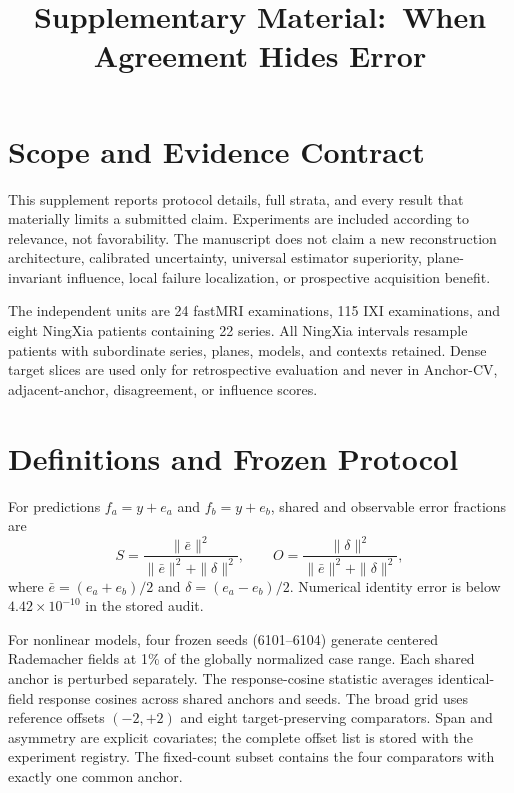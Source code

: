 \documentclass[10pt,twocolumn,letterpaper]{article}
\title{Supplementary Material:\
When Agreement Hides Error}
\begin{document}
\maketitle

\section{Scope and Evidence Contract}
This supplement reports protocol details, full strata, and every result that materially limits a submitted claim. Experiments are included according to relevance, not favorability. The manuscript does not claim a new reconstruction architecture, calibrated uncertainty, universal estimator superiority, plane-invariant influence, local failure localization, or prospective acquisition benefit.

The independent units are 24 fastMRI examinations, 115 IXI examinations, and eight NingXia patients containing 22 series. All NingXia intervals resample patients with subordinate series, planes, models, and contexts retained. Dense target slices are used only for retrospective evaluation and never in Anchor-CV, adjacent-anchor, disagreement, or influence scores.

\section{Definitions and Frozen Protocol}
For predictions $f_a=y+e_a$ and $f_b=y+e_b$, shared and observable error fractions are
\begin{equation}
S=\frac{\|\bar e\|^2}{\|\bar e\|^2+\|\delta\|^2},\qquad
O=\frac{\|\delta\|^2}{\|\bar e\|^2+\|\delta\|^2},
\end{equation}
where $\bar e=(e_a+e_b)/2$ and $\delta=(e_a-e_b)/2$. Numerical identity error is below $4.42\times10^{-10}$ in the stored audit.

For nonlinear models, four frozen seeds (6101--6104) generate centered Rademacher fields at 1\% of the globally normalized case range. Each shared anchor is perturbed separately. The response-cosine statistic averages identical-field response cosines across shared anchors and seeds. The broad grid uses reference offsets $(-2,+2)$ and eight target-preserving comparators. Span and asymmetry are explicit covariates; the complete offset list is stored with the experiment registry. The fixed-count subset contains the four comparators with exactly one common anchor.
\end{document}
